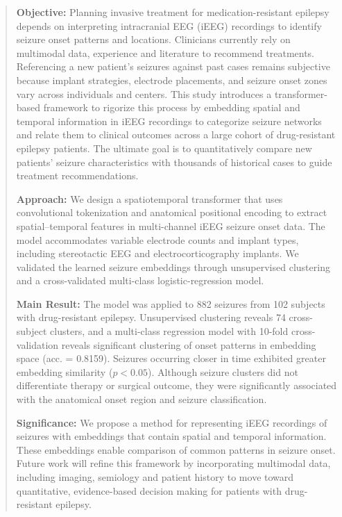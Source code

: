 \documentclass[11pt]{article}
\newcommand{\absdiv}[1]{%
  \par\addvspace{.5\baselineskip}%
  \noindent\textbf{#1}\quad\ignorespaces
}
\begin{document}
\begin{abstract}
\absdiv{Objective:} Planning invasive treatment for medication-resistant epilepsy depends on interpreting intracranial EEG (iEEG) recordings to identify seizure onset patterns and locations. Clinicians currently rely on multimodal data, experience and literature to recommend treatments. Referencing a new patient’s seizures against past cases remains subjective because implant strategies, electrode placements, and seizure onset zones vary across individuals and centers. This study introduces a transformer-based framework to rigorize this process by embedding spatial and temporal information in iEEG recordings to categorize seizure networks and relate them to clinical outcomes across a large cohort of drug-resistant epilepsy patients. The ultimate goal is to quantitatively compare new patients’ seizure characteristics with thousands of historical cases to guide treatment recommendations.
\absdiv{Approach:} We design a spatiotemporal transformer that uses convolutional tokenization and anatomical positional encoding to extract spatial–temporal features in multi-channel iEEG seizure onset data. The model accommodates variable electrode counts and implant types, including stereotactic EEG and electrocorticography implants. We validated the learned seizure embeddings through unsupervised clustering and a cross-validated multi-class logistic-regression model.
\absdiv{Main Result:} The model was applied to 882 seizures from 102 subjects with drug-resistant epilepsy. Unsupervised clustering reveals 74 cross-subject clusters, and a multi-class regression model with 10-fold cross-validation reveals significant clustering of onset patterns in embedding space (acc. = 0.8159). Seizures occurring closer in time exhibited greater embedding similarity ($p < 0.05$). Although seizure clusters did not differentiate therapy or surgical outcome, they were significantly associated with the anatomical onset region and seizure classification.
\absdiv{Significance:} We propose a method for representing iEEG recordings of seizures with embeddings that contain spatial and temporal information. These embeddings enable comparison of common patterns in seizure onset. Future work will refine this framework by incorporating multimodal data, including imaging, semiology and patient history to move toward quantitative, evidence-based decision making for patients with drug-resistant epilepsy.
\end{abstract}

\newpage
\end{document}

